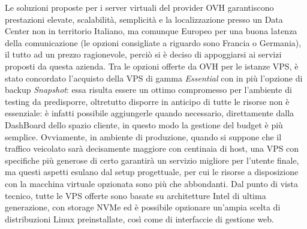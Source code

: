 Le soluzioni proposte per i server virtuali del provider OVH garantiscono prestazioni elevate, scalabilità, semplicità e la localizzazione presso un Data Center non in territorio Italiano, ma comunque Europeo per una buona latenza della comunicazione (le opzioni consigliate a riguardo sono Francia o Germania), il tutto ad un prezzo ragionevole, perciò si è deciso di appoggiarsi ai servizi proposti da questa azienda.\hfill\break
Tra le opzioni offerte da OVH per le istanze VPS, è stato concordato l'acquisto della VPS di gamma \textit{Essential} con in più l'opzione di backup \textit{Snapshot}: essa risulta essere un ottimo compromesso per l'ambiente di testing da predisporre, oltretutto disporre in anticipo di tutte le risorse non è essenziale: è infatti possibile aggiungerle quando necessario, direttamente dalla DashBoard dello spazio cliente, in questo modo la gestione del budget è più semplice. Ovviamente, in ambiente di produzione, quando si suppone che il traffico veicolato sarà decisamente maggiore con centinaia di host, una VPS con specifiche più generose di certo garantirà un servizio migliore per l’utente finale, ma questi aspetti esulano dal setup progettuale, per cui le risorse a disposizione con la macchina virtuale opzionata sono più che abbondanti.\hfill\break
Dal punto di vista tecnico, tutte le VPS offerte sono basate su architetture Intel di ultima generazione, con storage NVMe ed è possibile opzionare un'ampia scelta di distribuzioni Linux preinstallate, così come di interfaccie di gestione web.
